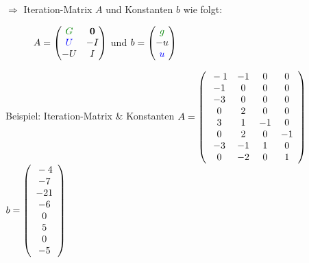 \begin{frame}[fragile]
	\begin{definition}
		$\Rightarrow$ Iteration-Matrix $A$ und Konstanten $b$ wie folgt:
		\vspace*{-1em}
		\begin{figure}[H]
			\centering
			$A = \begin{pmatrix} \green{G} & \textbf{0} \\ \blue{U} & -I \\ -U & I \end{pmatrix}$ und $b = \begin{pmatrix} \green{g} \\ -u \\ \blue{u} \end{pmatrix}$
		\end{figure}
	\end{definition}
	\begin{exampleblock}{Beispiel: Iteration-Matrix \& Konstanten}
		\centering
		\(
			A = \left(\begin{array}{*{4}{c}}
				\tikzmark{left1}-1 		& -1 		&  0		& 0		 \\
				-1 		& 0 		&  0		& 0		 \\
				-3 		& 0 		&  0		& 0		 \\
				0 		& 2 \tikzmark{right1}		&  0		& 0		 \\
				\tikzmark{left2}3 		& 1 		&  -1		& 0		 \\
				0 		& 2 \tikzmark{right2} 		&  0		& -1	 \\
				-3 		& -1 		&  1		& 0		 \\
				0 		& -2 		&  0		& 1	 	 \\           
			\end{array}\right)
		\)
		\(
		b = \left(\begin{array}{*{1}{c}}
		\tikzmark{sleft1}-4 \\ -7 \\ -21 \\ -6\tikzmark{sright1} \\ 0 \\ 5 \\ \tikzmark{sleft2}0 \\ -5 \tikzmark{sright2}	          
		\end{array}\right)
		\)
		
		\DrawFirstBox[thick]
		\DrawFirstSmallBox[thick]
		\DrawSecondBox[thick]
		\DrawSecondSmallBox[thick]
	\end{exampleblock}
\end{frame}


